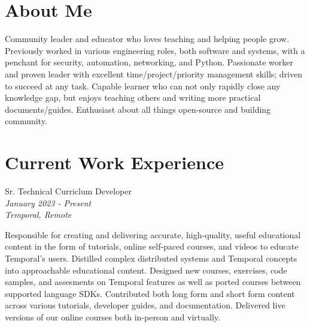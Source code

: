 \documentclass[10pt]{article} %
\begin{document}
\begin{minipage}[t]{0.5\textwidth} %
\vspace{0pt} %
    
\section{About Me}
Community leader and educator who loves teaching and helping people grow. Previously worked in various engineering roles, both software and systems, with a penchant for security, automation, networking, and Python. Passionate worker and proven leader with excellent time/project/priority management skills; driven to succeed at any task. Capable learner who can not only rapidly close any knowledge gap, but enjoys teaching others and writing more practical documents/guides. Enthusiast about all things open-source and building community. \\


\section{Current Work Experience} 


{\raggedright\large Sr. Technical Curriclum Developer\\
\small \textit{January 2023 - Present}\\
\small \textit{Temporal, Remote} \\} 

\normalsize{
    Responsible for creating and delivering accurate, high-quality, useful educational content in the form of tutorials, online self-paced courses, and videos to educate Temporal's users. Distilled complex distributed systems and Temporal concepts into approachable educational content. Designed new courses, exercises, code samples, and assesments on Temporal features as well as ported courses between supported language SDKs. Contributed both long form and short form content across various tutorials, developer guides, and documentation. Delivered live versions of our online courses both in-person and virtually.
} \\


\end{minipage}
\end{document}
